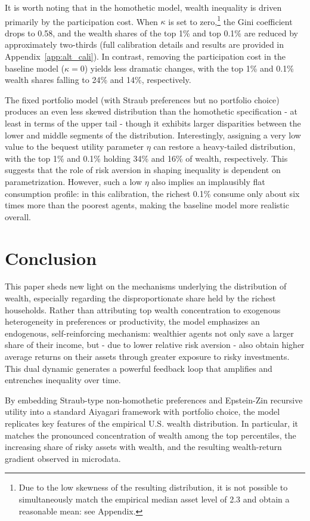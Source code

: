 \documentclass[12pt]{article}
\begin{document}
It is worth noting that in the homothetic model, wealth inequality is driven primarily by the participation cost. When $\kappa$ is set to zero,\footnote{Due to the low skewness of the resulting distribution, it is not possible to simultaneously match the empirical median asset level of 2.3 and obtain a reasonable mean: see Appendix.} the Gini coefficient drops to 0.58, and the wealth shares of the top 1\% and top 0.1\% are reduced by approximately two-thirds (full calibration details and results are provided in Appendix~\ref{app:alt_cali}). In contrast, removing the participation cost in the baseline model ($\kappa = 0$) yields less dramatic changes, with the top 1\% and 0.1\% wealth shares falling to 24\% and 14\%, respectively.

The fixed portfolio model (with Straub preferences but no portfolio choice) produces an even less skewed distribution than the homothetic specification - at least in terms of the upper tail - though it exhibits larger disparities between the lower and middle segments of the distribution. Interestingly, assigning a very low value to the bequest utility parameter $\eta$ can restore a heavy-tailed distribution, with the top 1\% and 0.1\% holding 34\% and 16\% of wealth, respectively. This suggests that the role of risk aversion in shaping inequality is dependent on parametrization. However, such a low $\eta$ also implies an implausibly flat consumption profile: in this calibration, the richest 0.1\% consume only about six times more than the poorest agents, making the baseline model more realistic overall.

\section{Conclusion}
\label{sec:conclusion}

This paper  sheds new light on the mechanisms underlying the distribution of wealth, especially regarding the disproportionate share held by the richest households. Rather than attributing top wealth concentration to exogenous heterogeneity in preferences or productivity, the model emphasizes an endogenous, self-reinforcing mechanism: wealthier agents not only save a larger share of their income, but - due to lower relative risk aversion - also obtain higher average returns on their assets through greater exposure to risky investments. This dual dynamic generates a powerful feedback loop that amplifies and entrenches inequality over time.

By embedding Straub-type non-homothetic preferences and Epstein-Zin recursive utility into a standard Aiyagari framework with portfolio choice, the model replicates key features of the empirical U.S. wealth distribution. In particular, it matches the pronounced concentration of wealth among the top percentiles, the increasing share of risky assets with wealth, and the resulting wealth-return gradient observed in microdata.
\end{document}
